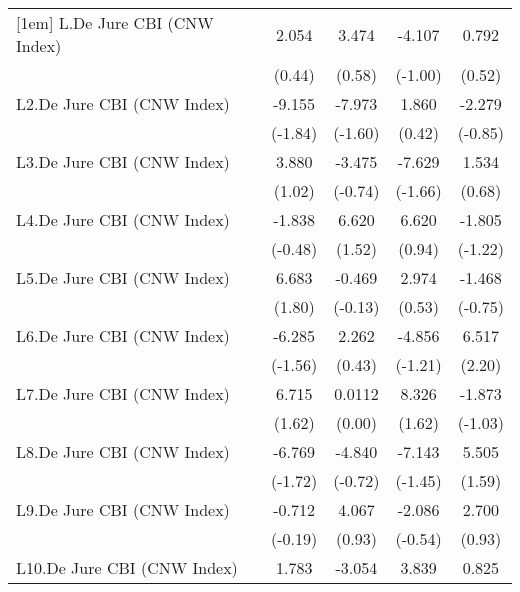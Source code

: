 {\begin{longtable}{l*{4}{c}}
[1em]
L.De Jure CBI (CNW Index)&    2.054         &    3.474         &   -4.107         &    0.792         \\
                &   (0.44)         &   (0.58)         &  (-1.00)         &   (0.52)         \\
[1em]
L2.De Jure CBI (CNW Index)&   -9.155         &   -7.973         &    1.860         &   -2.279         \\
                &  (-1.84)         &  (-1.60)         &   (0.42)         &  (-0.85)         \\
[1em]
L3.De Jure CBI (CNW Index)&    3.880         &   -3.475         &   -7.629         &    1.534         \\
                &   (1.02)         &  (-0.74)         &  (-1.66)         &   (0.68)         \\
[1em]
L4.De Jure CBI (CNW Index)&   -1.838         &    6.620         &    6.620         &   -1.805         \\
                &  (-0.48)         &   (1.52)         &   (0.94)         &  (-1.22)         \\
[1em]
L5.De Jure CBI (CNW Index)&    6.683         &   -0.469         &    2.974         &   -1.468         \\
                &   (1.80)         &  (-0.13)         &   (0.53)         &  (-0.75)         \\
[1em]
L6.De Jure CBI (CNW Index)&   -6.285         &    2.262         &   -4.856         &    6.517\sym{*}  \\
                &  (-1.56)         &   (0.43)         &  (-1.21)         &   (2.20)         \\
[1em]
L7.De Jure CBI (CNW Index)&    6.715         &   0.0112         &    8.326         &   -1.873         \\
                &   (1.62)         &   (0.00)         &   (1.62)         &  (-1.03)         \\
[1em]
L8.De Jure CBI (CNW Index)&   -6.769         &   -4.840         &   -7.143         &    5.505         \\
                &  (-1.72)         &  (-0.72)         &  (-1.45)         &   (1.59)         \\
[1em]
L9.De Jure CBI (CNW Index)&   -0.712         &    4.067         &   -2.086         &    2.700         \\
                &  (-0.19)         &   (0.93)         &  (-0.54)         &   (0.93)         \\
[1em]
L10.De Jure CBI (CNW Index)&    1.783         &   -3.054         &    3.839         &    0.825         \\

\end{longtable}}
